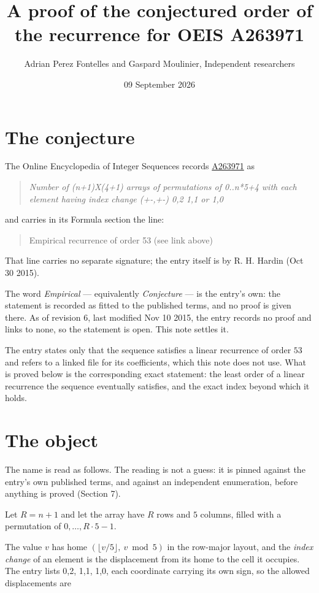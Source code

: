 \documentclass[11pt]{article}
\title{A proof of the conjectured order of the recurrence for OEIS A263971}
\author{Adrian Perez Fontelles and Gaspard Moulinier, Independent researchers}
\date{09 September 2026}
\theoremstyle{definition}
\begin{document}
\maketitle
\section{The conjecture}

The Online Encyclopedia of Integer Sequences records \href{https://oeis.org/A263971}{A263971} as

\begin{quote}\itshape Number of (n+1)X(4+1) arrays of permutations of 0..n*5+4 with each element having index change (+-,+-) 0,2 1,1 or 1,0\end{quote}

and carries in its Formula section the line:

\begin{quote}\ttfamily Empirical recurrence of order 53 (see link above)\end{quote}

That line carries no separate signature; the entry itself is by R. H. Hardin (Oct 30 2015).

The word {\itshape Empirical} --- equivalently {\itshape Conjecture} --- is the entry's own: the statement is recorded as fitted to the published terms, and no proof is given there. As of revision 6, last modified Nov 10 2015, the entry records no proof and links to none, so the statement is open. This note settles it.

The entry states only that the sequence satisfies a linear recurrence of order $53$ and refers to a linked file for its coefficients, which this note does not use. What is proved below is the corresponding exact statement: the least order of a linear recurrence the sequence eventually satisfies, and the exact index beyond which it holds.

\section{The object}

The name is read as follows. The reading is not a guess: it is pinned against the entry's own published terms, and against an independent enumeration, before anything is proved (Section 7).

Let $R = n + 1$ and let the array have $R$ rows and $5$ columns, filled with a permutation of $0,\dots,R\cdot5-1$.

The value $v$ has home $(\lfloor v/5\rfloor,\ v \bmod 5)$ in the row-major layout, and the {\itshape index change} of an element is the displacement from its home to the cell it occupies. The entry lists 0,2, 1,1, 1,0, each coordinate carrying its own sign, so the allowed displacements are
\end{document}
